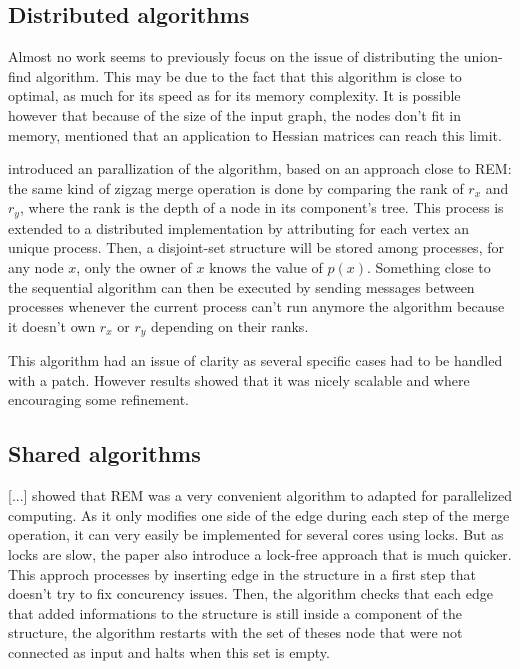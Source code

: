\documentclass[12px]{article}
\begin{document}
    \subsection{Distributed algorithms}
      Almost no work seems to previously focus on the issue of distributing the union-find algorithm.
      This may be due to the fact that this algorithm is close to optimal, as much for its speed as for its memory complexity.
      It is possible however that because of the size of the input graph, the nodes don't fit in memory,  mentioned that an application to Hessian matrices can reach this limit.

       introduced an parallization of the algorithm, based on an approach close to REM: the same kind of zigzag merge operation is done by comparing the rank of $r_x$ and $r_y$, where the rank is the depth of a node in its component's tree.
      This process is extended to a distributed implementation by attributing for each vertex an unique process. Then, a disjoint-set structure will be stored among processes, for any node $x$, only the owner of $x$ knows the value of $p(x)$.
      Something close to the sequential algorithm can then be executed by sending messages between processes whenever the current process can't run anymore the algorithm because it doesn't own $r_x$ or $r_y$ depending on their ranks.

      This algorithm had an issue of clarity as several specific cases had to be handled with a patch. However results showed that it was nicely scalable and where encouraging some refinement.

    \subsection{Shared algorithms}
      [...] showed that REM was a very convenient algorithm to adapted for parallelized computing. As it only modifies one side of the edge during each step of the merge operation, it can very easily be implemented for several cores using locks.
      But as locks are slow, the paper also introduce a lock-free approach that is much quicker. This approch processes by inserting edge in the structure in a first step that doesn't try to fix concurency issues. Then, the algorithm checks that each edge that added informations to the structure is still inside a component of the structure, the algorithm restarts with the set of theses node that were not connected as input and halts when this set is empty.
\end{document}
